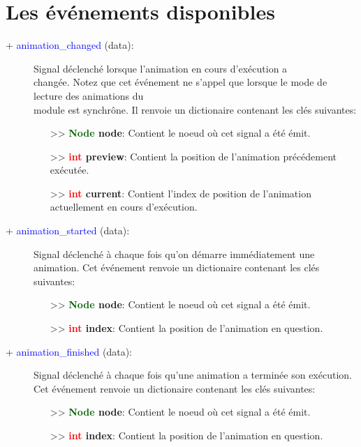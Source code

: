 \documentclass[a4paper, 11pt]{article}
\begin{document}
	\section{Les événements disponibles}
	\begin{description}
		\item [+ \textcolor{blue}{animation\_changed} (data):] Signal déclenché lorsque l'animation en cours 
		d'exécution a \\changée. Notez que cet événement ne s'appel que lorsque le mode de lecture des 
		animations du \\module est synchrône. Il renvoie un dictionaire contenant les clés suivantes:
		\begin{itemize}
			\item [>> \textbf{\textcolor{darkgreen}{Node} node}:] Contient le noeud où cet signal a été 
			émit.
			\item [>> \textbf{\textcolor{red}{int} preview}:] Contient la position de l'animation 
			précédement exécutée.
			\item [>> \textbf{\textcolor{red}{int} current}:] Contient l'index de position de l'animation
			actuellement en cours d'exécution.\\
		\end{itemize}
	\end{description}
	\begin{description}
		\item [+ \textcolor{blue}{animation\_started} (data):] Signal déclenché à chaque fois qu'on démarre 
		immédiatement une animation. Cet événement renvoie un dictionaire contenant les clés suivantes:
		\begin{itemize}
			\item [>> \textbf{\textcolor{darkgreen}{Node} node}:] Contient le noeud où cet signal a été 
			émit.
			\item [>> \textbf{\textcolor{red}{int} index}:] Contient la position de l'animation en question.
			\\
		\end{itemize}
	\end{description}
	\begin{description}
		\item [+ \textcolor{blue}{animation\_finished} (data):] Signal déclenché à chaque fois qu'une 
		animation a terminée son exécution. Cet événement renvoie un dictionaire contenant les clés 
		suivantes:
		\begin{itemize}
			\item [>> \textbf{\textcolor{darkgreen}{Node} node}:] Contient le noeud où cet signal a été 
			émit.
			\item [>> \textbf{\textcolor{red}{int} index}:] Contient la position de l'animation en question.
			\\
		\end{itemize}
	\end{description}
\end{document}
